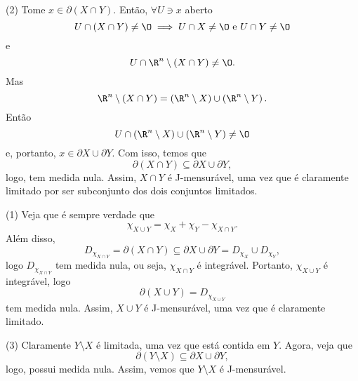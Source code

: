 \begin{demo}
    (2) Tome $x \in \partial \left( X\cap Y \right) $. Então, $\forall U \ni x$ aberto \[
    U\cap \left( X\cap Y \right) \neq  \O \implies U\cap X \neq \O\text{ e }U\cap Y\neq \O
    \] e \[
    U\cap \R^{n}\setminus\left( X\cap Y \right) \neq  \O
    .\] Mas \[
    \R^{n}\setminus\left( X\cap Y \right) = \left( \R^{n}\setminus X \right) \cup \left( \R^{n} \setminus Y \right) 
    .\] Então \[
    U\cap \left( \R^{n}\setminus X \right) \cup \left( \R^{n} \setminus Y \right) \neq \O
    \] e, portanto, $x\in \partial X \cup \partial Y$. Com isso, temos que \[
    \partial \left( X\cap Y \right) \subseteq \partial X \cup \partial Y
    ,\] logo, tem medida nula. Assim, $X\cap Y $ é J-mensurável, uma vez que é claramente limitado por ser subconjunto dos dois conjuntos limitados. 

    (1) Veja que é sempre verdade que \[
    \chi_{X\cup Y} = \chi_X + \chi_Y - \chi_{X\cap Y}
    .\] Além disso, \[
    D_{\chi_{X\cap Y}} = \partial \left( X\cap Y \right) \subseteq\partial X \cup \partial Y = D_{\chi_X} \cup D_{\chi_Y}
    ,\] logo $D_{\chi_{X\cap Y}}$ tem medida nula, ou seja, $\chi_{X\cap Y}$ é integrável. Portanto, $\chi_{X\cup Y}$ é integrável, logo \[
    \partial \left( X\cup Y \right) = D_{\chi_{X\cup Y}}
    \] tem medida nula. Assim, $X\cup Y$ é J-mensurável, uma vez que é claramente limitado.

    (3) Claramente $Y\setminus X$ é limitada, uma vez que está contida em $Y$. Agora, veja que \[
    \partial \left( Y\setminus X \right) \subseteq \partial X \cup \partial Y
    ,\] logo, possui medida nula. Assim, vemos que $Y\setminus X$ é J-mensurável.
\end{demo}

